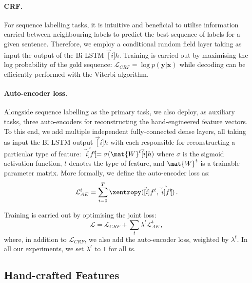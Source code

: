 \paragraph{CRF.} 
For sequence labelling tasks, it is intuitive and beneficial to utilise information carried between neighbouring labels to predict the best sequence of labels for a given sentence. 
Therefore, we employ a conditional random field layer \cite{lafferty2001conditional} taking as input the output of the Bi-LSTM $\vec[i]{h}$. 
Training is carried out by maximising the log probability of the gold sequence: $\mathcal{L}_{CRF} = \log p(\mathbf{y}|\mathbf{x})$ while decoding can be efficiently performed with the Viterbi algorithm.

\paragraph{Auto-encoder loss.} 
Alongside sequence labelling as the primary task, we also deploy, as auxiliary tasks, three auto-encoders for reconstructing the hand-engineered feature vectors. 
To this end, we add multiple independent fully-connected dense layers, all taking as input the Bi-LSTM output $\vec[i]{h}$ with each responsible for reconstructing a particular type of feature: $\hat{\vec[i]{f}^{t}} = \sigma(\mat{W}^{t}\vec[i]{h})$ where $\sigma$ is the sigmoid activation function, $t$ denotes the type of feature, and $\mat{W}^{t}$ is a trainable parameter matrix. 
More formally, we define the auto-encoder loss as:
\begin{equation}
\mathcal{L}_{AE}^{t} = \sum_{i=0}^{T}\xentropy(\vec[i]{f}^{t}, \hat{\vec[i]{f}^{t}})\,.
\end{equation}

Training is carried out by optimising the joint loss:
\begin{equation}
\mathcal{L} = \mathcal{L}_{CRF} + \sum_{t}\lambda^{t}\mathcal{L}_{AE}^{t}\,,
\end{equation}
where, in addition to $\mathcal{L}_{CRF}$, we also add the auto-encoder loss, weighted by $\lambda^t$. In all our experiments, we set $\lambda^t$ to $1$ for all $t$s.

\subsection{Hand-crafted Features}
\label{sec:features}

